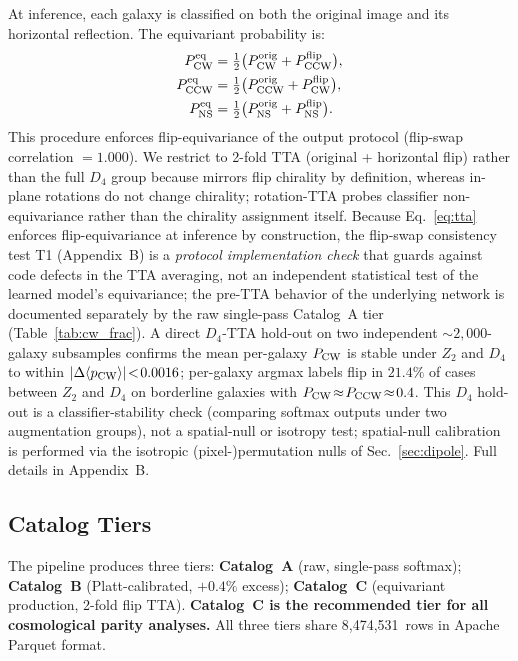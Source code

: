 \documentclass[aps,prd,twocolumn,superscriptaddress,preprintnumbers,nofootinbib,longbibliography,floatfix]{revtex4-2}
\newcommand{\pcw}{P_{\rm CW}}
\newcommand{\pccw}{P_{\rm CCW}}
\newcommand{\pns}{P_{\rm NS}}
\begin{document}
At inference, each galaxy is classified on both the original image and its horizontal reflection. The equivariant probability is:
\begin{align}
\pcw^{\rm eq} &= \tfrac{1}{2}\bigl(\pcw^{\rm orig} + \pccw^{\rm flip}\bigr), \nonumber \\
\pccw^{\rm eq} &= \tfrac{1}{2}\bigl(\pccw^{\rm orig} + \pcw^{\rm flip}\bigr), \label{eq:tta} \\
\pns^{\rm eq} &= \tfrac{1}{2}\bigl(\pns^{\rm orig} + \pns^{\rm flip}\bigr). \nonumber
\end{align}
This procedure enforces flip-equivariance of the output protocol (flip-swap correlation $= 1.000$). We restrict to 2-fold TTA (original + horizontal flip) rather than the full $D_4$ group because mirrors flip chirality by definition, whereas in-plane rotations do not change chirality; rotation-TTA probes classifier non-equivariance rather than the chirality assignment itself. Because Eq.~\eqref{eq:tta} enforces flip-equivariance at inference by construction, the flip-swap consistency test T1 (Appendix~B) is a \emph{protocol implementation check} that guards against code defects in the TTA averaging, not an independent statistical test of the learned model's equivariance; the pre-TTA behavior of the underlying network is documented separately by the raw single-pass Catalog~A tier (Table~\ref{tab:cw_frac}). A direct $D_4$-TTA hold-out on two independent $\sim\!2{,}000$-galaxy subsamples confirms the mean per-galaxy $\pcw$ is stable under $Z_2$ and $D_4$ to within $|\Delta\langle p_{\rm CW}\rangle|\!<\!0.0016$; per-galaxy argmax labels flip in $21.4\%$ of cases between $Z_2$ and $D_4$ on borderline galaxies with $\pcw\!\approx\!\pccw\!\approx\!0.4$. This $D_4$ hold-out is a classifier-stability check (comparing softmax outputs under two augmentation groups), not a spatial-null or isotropy test; spatial-null calibration is performed via the isotropic (pixel-)permutation nulls of Sec.~\ref{sec:dipole}. Full details in Appendix~B.

\subsection{Catalog Tiers}
\label{sec:tiers}

The pipeline produces three tiers: \textbf{Catalog~A} (raw, single-pass softmax); \textbf{Catalog~B} (Platt-calibrated, $+0.4\%$ excess); \textbf{Catalog~C} (equivariant production, 2-fold flip TTA). \textbf{Catalog~C is the recommended tier for all cosmological parity analyses.} All three tiers share 8,474,531~rows in Apache Parquet format.
\end{document}

